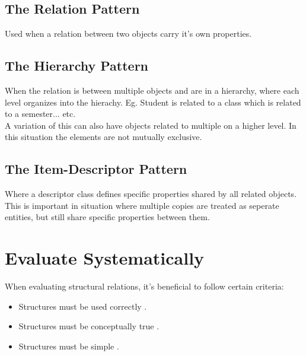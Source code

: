 \subsection*{The Relation Pattern}
Used when a relation between two objects carry it's own properties.

\subsection*{The Hierarchy Pattern}
When the relation is between multiple objects and are in a hierarchy, where each level organizes into the hierachy. Eg. Student is related to a class which is related to a semester... etc.\\
A variation of this can also have objects related to multiple on a higher level. In this situation the elements are not mutually exclusive.

\subsection*{The Item-Descriptor Pattern}
Where a descriptor class defines specific properties shared by all related objects. This is important in situation where multiple copies are treated as seperate entities, but still share specific properties between them.

\section{Evaluate Systematically \ooad[86]}
When evaluating structural relations, it's beneficial to follow certain criteria:
\begin{itemize}
    \item Structures must be  used correctly \ooad[86].
    \item Structures must be conceptually true \ooad[87].
    \item Structures must be simple \ooad[88].
\end{itemize}